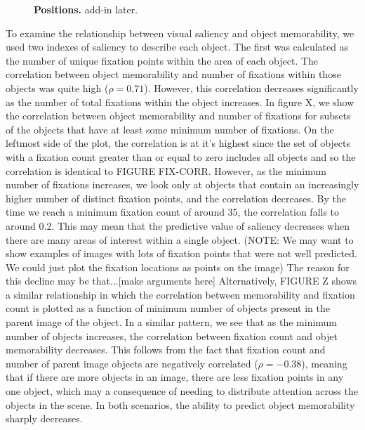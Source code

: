 

\begin{figure}[b]
\centering
{}
\vspace{-5mm}\caption{\footnotesize\textbf{Positions.} add-in later. }\label{fig:exampleStimuli}
\end{figure}
To examine the relationship between visual saliency and object memorability, we used two indexes of saliency to describe each object. The first was calculated as the number of unique fixation points within the area of each object. The correlation between object memorability and number of fixations within those objects was quite high ($\rho = 0.71$). However, this correlation decreases significantly as the number of total fixations within the object increases. In figure X, we show the correlation between object memorability and number of fixations for subsets of the objects that have at least some minimum number of fixations. On the leftmost side of the plot, the correlation is at it's highest since the set of objects with a fixation count greater than or equal to zero includes all objects and so the correlation is identical to FIGURE FIX-CORR. However, as the minimum number of fixations increases, we look only at objects that contain an increasingly higher number of distinct fixation points, and the correlation decreases. By the time we reach a minimum fixation count of around 35, the correlation falls to around 0.2. This may mean that the predictive value of saliency decreases when there are many areas of interest within a single object. (NOTE: We may want to show examples of images with lots of fixation points that were not well predicted. We could just plot the fixation locations as points on the image) The reason for this decline may be that...[make arguments here] Alternatively, FIGURE Z shows a similar relationship in which the correlation between memorability and fixation count is plotted as a function of minimum number of objects present in the parent image of the object. In a similar pattern, we see that as the minimum number of objects increases, the correlation between fixation count and objet memorability decreases. This follows from the fact that fixation count and number of parent image objects are negatively correlated ($\rho = -0.38$), meaning that if there are more objects in an image, there are less fixation points in any one object, which may a consequence of needing to distribute attention across the objects in the scene. In both scenarios, the ability to predict object memorability sharply decreases.


